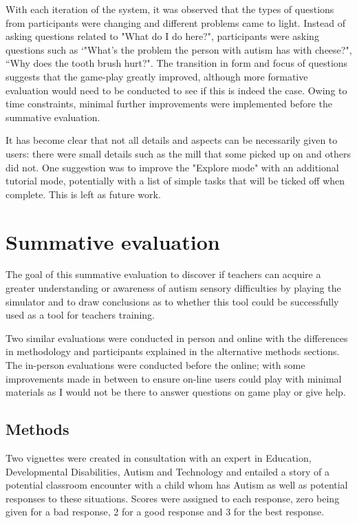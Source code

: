 \documentclass[11pt]{report}
\begin{document}
With each iteration of the system, it was observed that the types of questions from participants were changing and different problems came to light. Instead of asking questions related to "What do I do here?", participants were asking questions such as `"What's the problem the person with autism has with cheese?", ``Why does the tooth brush hurt?". The transition in form and focus of questions suggests that the game-play greatly improved, although more formative evaluation would need to be conducted to see if this is indeed the case. Owing to time constraints, minimal further improvements were implemented before the summative evaluation. 

It has become clear that not all details and aspects can be necessarily given to users: there were small details such as the mill that some picked up on and others did not. One suggestion was to improve the "Explore mode" with an additional tutorial mode, potentially with a list of simple tasks that will be ticked off when complete. This is left as future work.


\chapter{Summative evaluation}
The goal of this summative evaluation to discover if teachers can acquire a greater understanding or awareness of autism sensory difficulties by playing the simulator and to draw conclusions as to whether this tool could be successfully used as a tool for teachers training. 

Two similar evaluations were conducted in person and online with the differences in methodology and participants explained in the alternative methods sections. The in-person evaluations were conducted before the online; with some improvements made in between to ensure on-line users could play with minimal materials as I would not be there to answer questions on game play or give help. 


\section{Methods}
Two vignettes were created in consultation with an expert in Education, Developmental Disabilities, Autism and Technology and entailed a story of a potential classroom encounter with a child whom has Autism as well as potential responses to these situations. Scores were assigned to each response, zero being given for a bad response, 2 for a good response and 3 for the best response.
\end{document}
